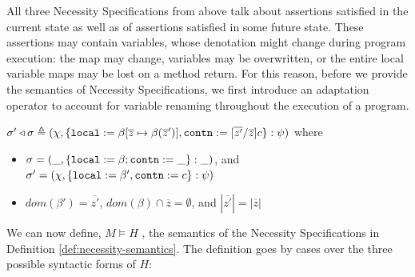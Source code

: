 All three Necessity Specifications from above talk about assertions satisfied in the 
current state as well as of assertions satisfied in some future state. 
These assertions may contain variables, whose denotation might change during
program execution: the 
map may change, variables may be overwritten, or the entire local variable maps may be lost on a method return.
For this reason, before we provide the semantics of Necessity Specifications, we first introduce an adaptation operator
to account for variable renaming throughout the execution of a program.
\begin{definition}
$\sigma' \triangleleft \sigma \triangleq (\chi, \{{\texttt{local}} := \beta[\overline{z} \mapsto \beta(\overline{z}')], {\texttt{contn}}:= [\overline{z'}/\overline{z}]c\} : \psi)$
where 
\begin{itemize}
\item
$\sigma = (\_, \{{\texttt{local}}:=\beta; {\texttt{contn}}:=\_\} : \_)$, and
$\sigma' = (\chi, \{{\texttt{local}}:=\beta', {\texttt{contn}}:=c\} : \psi)$
\item
$dom(\beta') = \overline{z'}$, $dom(\beta) \cap \overline{z} = \emptyset$, and $|\overline{z'}| = |\overline{z}|$
\end{itemize}
\end{definition}

We can now define,  $M \models H$ , the semantics of the Necessity Specifications in Definition \ref{def:necessity-semantics}.  The definition goes by cases over the three possible syntactic forms of $H$: 


